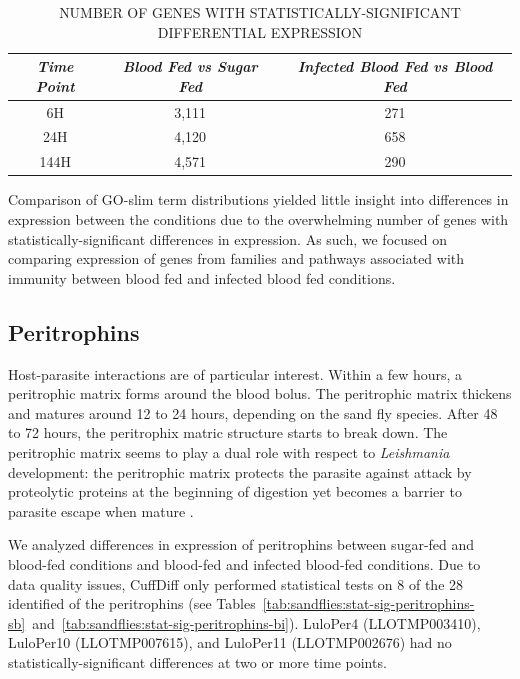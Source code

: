 \begin{table}[H]
  \centering
  \caption{\uppercase{Number of Genes with Statistically-Significant Differential Expression}}
  \begin{tabular}{c c c} \hline
  \emph{Time Point} & \emph{Blood Fed vs Sugar Fed} & \emph{Infected Blood Fed vs Blood Fed} \\ \hline
  6H & 3,111 & 271 \\
  24H & 4,120 & 658 \\
  144H & 4,571 & 290 \\
  \end{tabular}
  \label{tab:stat-sig-genes}
\end{table}

Comparison of GO-slim term distributions yielded little insight into differences in expression between the conditions due to the overwhelming number of genes with statistically-significant differences in expression.  As such, we focused on comparing expression of genes from families and pathways associated with immunity between blood fed and infected blood fed conditions.

\subsection{Peritrophins}
Host-parasite interactions are of particular interest.  Within a few hours, a peritrophic matrix forms around the blood bolus.  The peritrophic matrix thickens and matures around 12 to 24 hours, depending on the sand fly species.  After 48 to 72 hours, the peritrophix matric structure starts to break down.  The peritrophic matrix seems to play a dual role with respect to \emph{Leishmania} development: the peritrophic matrix protects the parasite against attack by proteolytic proteins at the beginning of digestion yet becomes a barrier to parasite escape when mature \cite{Pimenta1997,Dostalova2012}.

We analyzed differences in expression of peritrophins between sugar-fed and blood-fed conditions and blood-fed and infected blood-fed conditions.  Due to data quality issues, CuffDiff only performed statistical tests on 8 of the 28 identified of the peritrophins (see Tables~\ref{tab:sandflies:stat-sig-peritrophins-sb}~and~\ref{tab:sandflies:stat-sig-peritrophins-bi}).  LuloPer4 (LLOTMP003410), LuloPer10 (LLOTMP007615), and LuloPer11 (LLOTMP002676) had no statistically-significant differences at two or more time points.

